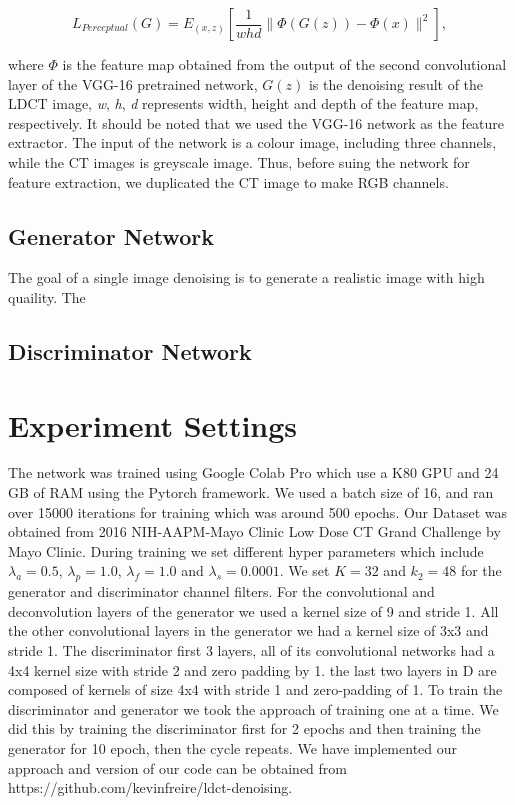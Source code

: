 \documentclass[journal]{IEEEtran}
\begin{document}
\begin{equation}
	L_{Perceptual}(G) = E_{(x,z)}\left[ \frac{1}{whd}\|\Phi(G(z))-\Phi(x)\|^2 \right],
\end{equation}

	where $\Phi$ is the feature map obtained from the output of the second convolutional layer of the VGG-16 pretrained network, $G(z)$ is the denoising result of the LDCT image, \emph{w}, \emph{h}, \emph{d} represents width, height and depth of the feature map, respectively.  It should be noted that we used the VGG-16 network as the feature extractor.  The input of the network is a colour image, including three channels, while the CT images is greyscale image.  Thus, before suing the network for feature extraction, we duplicated the CT image to make RGB channels.

\subsection{Generator Network}
\label{generator}
The goal of a single image denoising is to generate a realistic image with high quaility.  The 

\subsection{Discriminator Network}
\label{discriminator}


\section{Experiment Settings}
\label{experiment settings}
The network was trained using Google Colab Pro which use a K80 GPU and 24 GB of RAM using the Pytorch framework. We used a batch size of 16,  and ran over 15000 iterations for training which was around 500 epochs.  Our Dataset was obtained from 2016 NIH-AAPM-Mayo Clinic Low Dose CT Grand Challenge by Mayo Clinic.  During training we set different hyper parameters which include $\lambda_a=0.5$, $\lambda_p=1.0$, $\lambda_f=1.0$ and $\lambda_s=0.0001$. We set $K=32$ and $k_2=48$ for the generator and discriminator channel filters.  For the convolutional and deconvolution layers of the generator we used a kernel size of 9 and stride 1.  All the other convolutional layers in the generator we had a kernel size of 3x3 and stride 1.   The discriminator first 3 layers, all of its convolutional networks had a 4x4 kernel size with stride 2 and zero padding by 1.  the last two layers in D are composed of kernels of size 4x4 with stride 1 and zero-padding of 1. To train the discriminator and generator we took the approach of training one at a time.  We did this by training the discriminator first for 2 epochs and then training the generator for 10 epoch, then the cycle repeats.  We have implemented our approach and version of our code can be obtained from https://github.com/kevinfreire/ldct-denoising.
\end{document}
